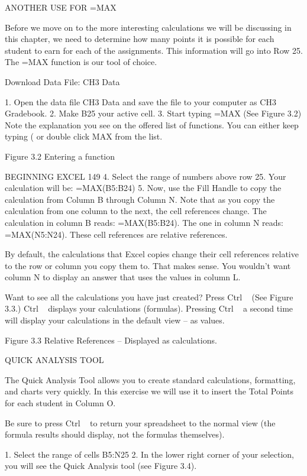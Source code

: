 ANOTHER USE FOR =MAX

Before we move on to the more interesting calculations we will be discussing in this chapter, we need
to determine how many points it is possible for each student to earn for each of the assignments. This
information will go into Row 25. The =MAX function is our tool of choice.

Download Data File: CH3 Data

1. Open the data file CH3 Data and save the file to your computer as CH3 Gradebook.
2. Make B25 your active cell.
3. Start typing =MAX (See Figure 3.2) Note the explanation you see on the offered list of
functions. You can either keep typing ( or double click MAX from the list.




Figure 3.2 Entering a function


BEGINNING EXCEL 149
4. Select the range of numbers above row 25. Your calculation will be: =MAX(B5:B24)
5. Now, use the Fill Handle to copy the calculation from Column B through Column N.
Note that as you copy the calculation from one column to the next, the cell references change.
The calculation in column B reads: =MAX(B5:B24). The one in column N reads:
=MAX(N5:N24). These cell references are relative references.

By default, the calculations that Excel copies change their cell references relative to the row or
column you copy them to. That makes sense. You wouldn’t want column N to display an answer that
uses the values in column L.

Want to see all the calculations you have just created? Press Ctrl ~ (See Figure 3.3.) Ctrl ~ displays
your calculations (formulas). Pressing Ctrl ~ a second time will display your calculations in the default
view – as values.




Figure 3.3 Relative References – Displayed as calculations.


QUICK ANALYSIS TOOL

The Quick Analysis Tool allows you to create standard calculations, formatting, and charts very
quickly. In this exercise we will use it to insert the Total Points for each student in Column O.

Be sure to press Ctrl ~ to return your spreadsheet to the normal view (the formula results should
display, not the formulas themselves).

1. Select the range of cells B5:N25
2. In the lower right corner of your selection, you will see the Quick Analysis tool (see Figure 3.4).




